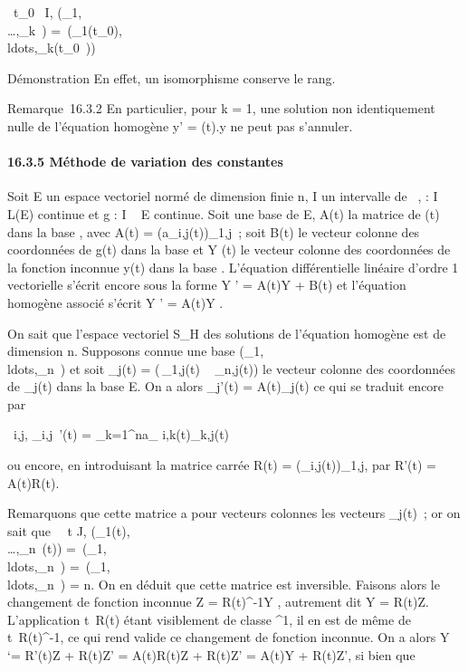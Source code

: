 \forall~t_0~ \in I,
\mathrmrg(\phi_1,\\\ldots,\phi_k~)
=\
\mathrmrg(\phi_1(t_0),\\ldots,\phi_k(t_0~))

Démonstration En effet, un isomorphisme conserve le rang.

Remarque~16.3.2 En particulier, pour k = 1, une solution non
identiquement nulle de l'équation homogène y' = \ell(t).y ne peut pas
s'annuler.

\paragraph{16.3.5 Méthode de variation des constantes}

Soit E un espace vectoriel normé de dimension finie n, I un intervalle
de \mathbb{R}~, \ell : I \rightarrow~ L(E) continue et g : I \rightarrow~ E continue. Soit  une base de E,
A(t) la matrice de \ell(t) dans la base , avec A(t) =
(a_i,j(t))_1\leqi,j\leqn~; soit B(t) le vecteur colonne des
coordonnées de g(t) dans la base  et Y (t) le vecteur colonne des
coordonnées de la fonction inconnue y(t) dans la base \mathcal{E}. L'équation
différentielle linéaire d'ordre 1 vectorielle s'écrit encore sous la
forme Y ' = A(t)Y + B(t) et l'équation homogène associé s'écrit Y ' =
A(t)Y .

On sait que l'espace vectoriel S_H des solutions de l'équation
homogène est de dimension n. Supposons connue une base
(\phi_1,\\ldots,\phi_n~)
et soit \Phi_j(t) = \left
(\matrix\,\phi_1,j(t)
\cr \⋮~
\cr \phi_n,j(t)\right ) le vecteur
colonne des coordonnées de \phi_j(t) dans la base E. On a alors
\Phi_j'(t) = A(t)\Phi_j(t) ce qui se traduit encore par

\forall~i,j, \phi_i,j~'(t) =
\sum _k=1^na_
i,k(t)\psi_k,j(t)

ou encore, en introduisant la matrice carrée R(t) =
(\psi_i,j(t))_1\leqi,j\leqn, par R'(t) = A(t)R(t).

Remarquons que cette matrice a pour vecteurs colonnes les vecteurs
\Phi_j(t)~; or on sait que \forall~~t \in J,
\mathrmrg(\Phi_1(t),\\\ldots,\Phi_n~(t))
=\
\mathrmrg(\Phi_1,\\ldots,\Phi_n~)
=\
\mathrmrg(\phi_1,\\ldots,\phi_n~)
= n. On en déduit que cette matrice est inversible. Faisons alors le
changement de fonction inconnue Z = R(t)^-1Y , autrement dit
Y = R(t)Z. L'application t\mapsto~R(t) étant
visiblement de classe \mathcal{C}^1, il en est de même de
t\mapsto~R(t)^-1, ce qui rend valide ce
changement de fonction inconnue. On a alors Y `= R'(t)Z + R(t)Z' =
A(t)R(t)Z + R(t)Z' = A(t)Y + R(t)Z', si bien que

